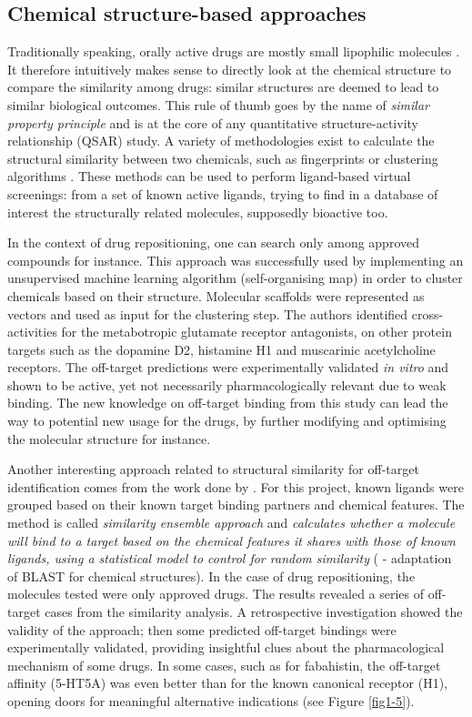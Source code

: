 \subsection{Chemical structure-based approaches}
Traditionally speaking, orally active drugs are mostly small lipophilic molecules \citep{lipinski1997experimental}. It therefore intuitively makes sense to directly look at the chemical structure to compare the similarity among drugs: similar structures are deemed to lead to similar biological outcomes. This rule of thumb goes by the name of \emph{similar property principle} \citep{johnson1990concepts} and is at the core of any quantitative structure-activity relationship (QSAR) study. A variety of methodologies exist to calculate the structural similarity between two chemicals, such as fingerprints or clustering algorithms \citep{eckert2007molecular}. These methods can be used to perform ligand-based virtual screenings: from a set of known active ligands, trying to find in a database of interest the structurally related molecules, supposedly bioactive too.

In the context of drug repositioning, one can search only among approved compounds for instance. This approach was successfully used by \cite{noeske2006predicting} implementing an unsupervised machine learning algorithm (self-organising map) in order to cluster chemicals based on their structure. Molecular scaffolds were represented as vectors and used as input for the clustering step. The authors identified cross-activities for the metabotropic glutamate receptor antagonists, on other protein targets such as the dopamine D2, histamine H1 and muscarinic acetylcholine receptors. The off-target predictions were experimentally validated \emph{in vitro} and shown to be active, yet not necessarily pharmacologically relevant due to weak binding. The new knowledge on off-target binding from this study can lead the way to potential new usage for the drugs, by further modifying and optimising the molecular structure for instance.

Another interesting approach related to structural similarity for off-target identification comes from the work done by \cite{keiser2009predicting}. For this project, known ligands were grouped based on their known target binding partners and chemical features. The method is called \emph{similarity ensemble approach} and \emph{calculates whether a molecule will bind to a target based on the chemical features it shares with those of known ligands, using a statistical model to control for random similarity} (\cite{lounkine2012large} - adaptation of BLAST for chemical structures). In the case of drug repositioning, the molecules tested were only approved drugs. The results revealed a series of off-target cases from the similarity analysis. A retrospective investigation showed the validity of the approach; then some predicted off-target bindings were experimentally validated, providing insightful clues about the pharmacological mechanism of some drugs. In some cases, such as for fabahistin, the off-target affinity (5-HT5A) was even better than for the known canonical receptor (H1), opening doors for meaningful alternative indications (see Figure \ref{fig1-5}).

